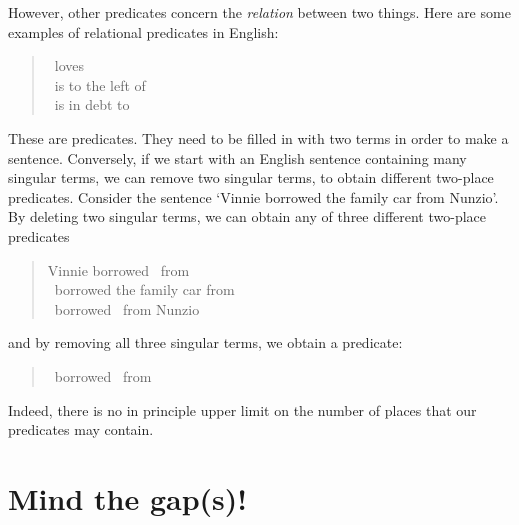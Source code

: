 However, other predicates concern the \emph{relation} between two things. Here are some examples of relational predicates in English:
	\begin{quote}
		\blank\ loves \blank\\
		\blank\ is to the left of \blank\\
		\blank\ is in debt to \blank
	\end{quote}
These are  predicates. They need to be filled in with two terms in order to make a sentence. Conversely, if we start with an English sentence containing many singular terms, we can remove two singular terms, to obtain different two-place predicates. Consider the sentence `Vinnie borrowed the family car from Nunzio'. By deleting two singular terms, we can obtain any of three different two-place predicates
	\begin{quote}
		Vinnie borrowed \blank\ from \blank\\
		\blank\ borrowed the family car from \blank\\
		\blank\ borrowed \blank\ from Nunzio
	\end{quote}
and by removing all three singular terms, we  obtain a  predicate:
	\begin{quote}
		\blank\ borrowed \blank\ from \blank
	\end{quote}
Indeed, there is no in principle upper limit on the number of places that our predicates may contain.

\section{Mind the gap(s)!}

